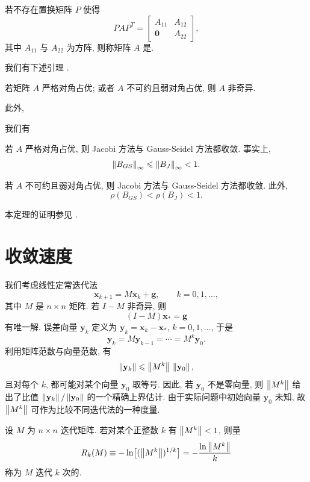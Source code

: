 \begin{definition}
\label{def:5-2}
若不存在置换矩阵 $P$ 使得
\[
  PAP^T=
  \begin{bmatrix}
    A_{11} & A_{12}\\
    \mathbf{0} & A_{22}
  \end{bmatrix},
\]
其中 $A_{11}$ 与 $A_{22}$ 为方阵, 则称矩阵 $A$ 是.
\end{definition}

我们有下述引理 \cite{src:85}.

\begin{lemma}
\label{lem:5-1}
若矩阵 $A$ 严格对角占优; 或者 $A$ 不可约且弱对角占优, 则 $A$ 非奇异.
\end{lemma}

此外,

\begin{theorem}
\label{thm:5-7}
我们有
\begin{romanlist}
  \item 若 $A$ 严格对角占优, 则 Jacobi 方法与 Gauss-Seidel 方法都收敛. 事实上,
  \[
    \left\|B_{GS}\right\|_\infty\leqslant\left\|B_J\right\|_\infty<1.
  \]
  \item 若 $A$ 不可约且弱对角占优, 则 Jacobi 方法与 Gauss-Seidel 方法都收敛. 此外,
  \[
    \rho(B_{GS})<\rho(B_J)<1.
  \]
\end{romanlist}
\end{theorem}

本定理的证明参见 \cite{src:30,src:85}.

\section{收敛速度}
\label{sec:5-3}

我们考虑线性定常迭代法
\[
  \mathbf{x}_{k+1}=M\mathbf{x}_k+\mathbf{g},\qquad k=0,1,\ldots,
\]
其中 $M$ 是 $n\times n$ 矩阵. 若 $I-M$ 非奇异, 则
\[
  (I-M)\mathbf{x}_*=\mathbf{g}
\]
有唯一解. 误差向量 $\mathbf{y}_k$ 定义为 $\mathbf{y}_k=\mathbf{x}_k-\mathbf{x}_*$, $k=0,1,\ldots$, 于是
\[
  \mathbf{y}_k=M\mathbf{y}_{k-1}=\cdots=M^k\mathbf{y}_0.
\]
利用矩阵范数与向量范数, 有
\[
  \left\|\mathbf{y}_k\right\|\leqslant\left\|M^k\right\|\,\left\|\mathbf{y}_0\right\|,
\]
且对每个 $k$, 都可能对某个向量 $\mathbf{y}_0$ 取等号. 因此, 若 $\mathbf{y}_0$ 不是零向量, 则 $\left\|M^k\right\|$ 给出了比值 $\left\|\mathbf{y}_k\right\|/\left\|\mathbf{y}_0\right\|$ 的一个精确上界估计. 由于实际问题中初始向量 $\mathbf{y}_0$ 未知, 故 $\left\|M^k\right\|$ 可作为比较不同迭代法的一种度量.

\begin{definition}
\label{def:5-3}
设 $M$ 为 $n\times n$ 迭代矩阵. 若对某个正整数 $k$ 有 $\left\|M^k\right\|<1$, 则量
\[
  R_k(M)\equiv-\ln\bigl[(\left\|M^k\right\|)^{1/k}\bigr]=-\frac{\ln\left\|M^k\right\|}{k}
\]
称为 $M$ 迭代 $k$ 次的.
\end{definition}

